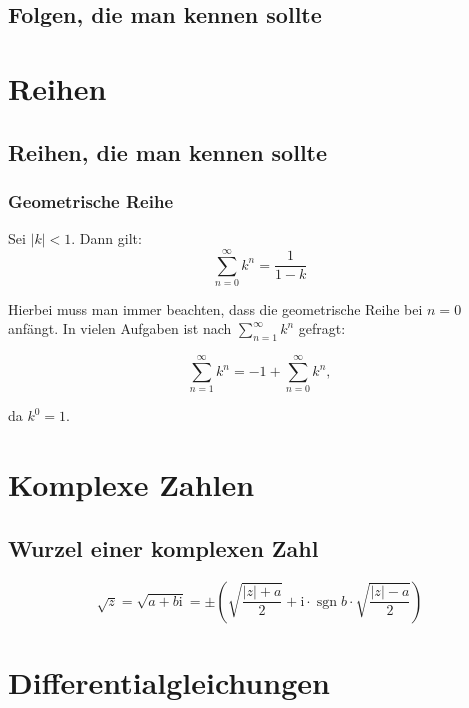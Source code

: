 \documentclass[a4paper, 16pt]{article}
\newcommand{\cmi}{\mathrm{i}}
\DeclareMathOperator{\sgn}{sgn}
\begin{document}
	\subsection{Folgen, die man kennen sollte}

	\section{Reihen}

	\subsection{Reihen, die man kennen sollte}

	\subsubsection{Geometrische Reihe}

	Sei $|k| < 1$. Dann gilt:
	\begin{equation*}
		\sum\limits_{n = 0}^{\infty}{k^n} = \frac{1}{1 - k}
	\end{equation*}

	Hierbei muss man immer beachten, dass die geometrische Reihe bei $n = 0$ anfängt.
	In vielen Aufgaben ist nach $\sum_{n = 1}^{\infty}{k^n}$ gefragt:
	
	\begin{equation*}
		\sum\limits_{n = 1}^{\infty}{k^n} = -1 + \sum\limits_{n = 0}^{\infty}{k^n},
	\end{equation*}

	da $k^0 = 1$.

	\section{Komplexe Zahlen}

	\subsection{Wurzel einer komplexen Zahl}

	\begin{equation*}
		\sqrt{z} = \sqrt{a + b\cmi} = \pm \left(\sqrt{\frac{|z| + a}{2}} + \cmi \cdot \sgn{b} \cdot \sqrt{\frac{|z| - a}{2}} \right)
	\end{equation*}

	\section{Differentialgleichungen}
\end{document}
